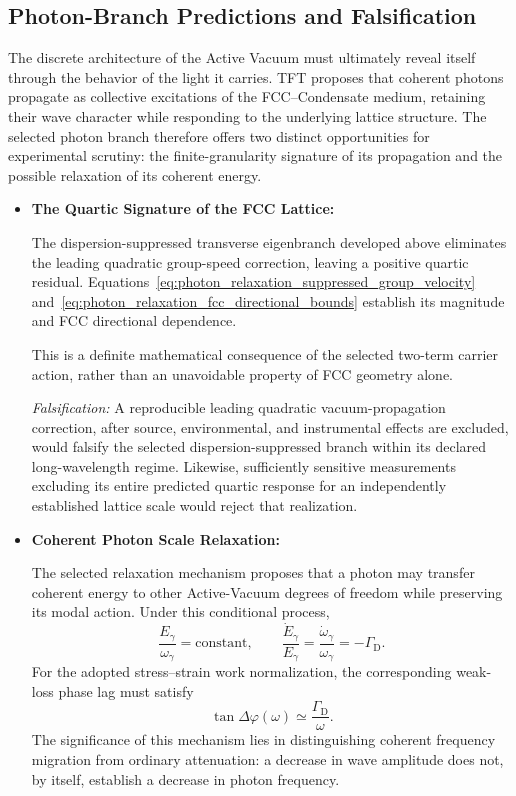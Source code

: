 \subsection{Photon-Branch Predictions and Falsification}
\label{subsec:photon_relaxation_falsifiability}

The discrete architecture of the Active Vacuum must ultimately
reveal itself through the behavior of the light it carries.
TFT proposes that coherent photons propagate as collective
excitations of the FCC--Condensate medium, retaining their
wave character while responding to the underlying lattice
structure. The selected photon branch therefore offers two
distinct opportunities for experimental scrutiny: the
finite-granularity signature of its propagation and the
possible relaxation of its coherent energy.

\begin{itemize}

\item \textbf{The Quartic Signature of the FCC Lattice:}

The dispersion-suppressed transverse eigenbranch developed
above eliminates the leading quadratic group-speed
correction, leaving a positive quartic residual.
Equations~\eqref{eq:photon_relaxation_suppressed_group_velocity}
and~\eqref{eq:photon_relaxation_fcc_directional_bounds}
establish its magnitude and FCC directional dependence.

This is a definite mathematical consequence of the
selected two-term carrier action, rather than an
unavoidable property of FCC geometry alone.

\textit{Falsification:} A reproducible leading quadratic
vacuum-propagation correction, after source, environmental,
and instrumental effects are excluded, would falsify the
selected dispersion-suppressed branch within its declared
long-wavelength regime. Likewise, sufficiently sensitive
measurements excluding its entire predicted quartic
response for an independently established lattice scale
would reject that realization.

\item \textbf{Coherent Photon Scale Relaxation:}

The selected relaxation mechanism proposes that a photon
may transfer coherent energy to other Active-Vacuum
degrees of freedom while preserving its modal action.
Under this conditional process,
%
\[
\frac{E_\gamma}{\omega_\gamma}
=\mathrm{constant},
\qquad
\frac{\dot E_\gamma}{E_\gamma}
=
\frac{\dot\omega_\gamma}{\omega_\gamma}
=-\Gamma_{\mathrm D}.
\]
%
For the adopted stress--strain work normalization,
the corresponding weak-loss phase lag must satisfy
%
\[
\tan\Delta\varphi(\omega)
\simeq
\frac{\Gamma_{\mathrm D}}{\omega}.
\]
%
The significance of this mechanism lies in distinguishing
coherent frequency migration from ordinary attenuation:
a decrease in wave amplitude does not, by itself,
establish a decrease in photon frequency.


\end{itemize}
